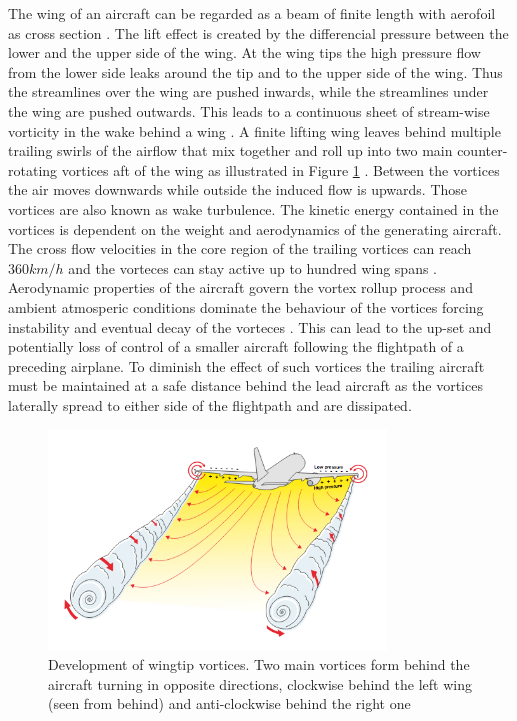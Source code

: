 The wing of an aircraft can be regarded as a beam of finite length with aerofoil as cross section \cite{hansen2015aerodynamics}. The lift effect is created by the differencial pressure between the lower and the upper side of the wing. At the wing tips the high pressure flow from the lower side leaks around the tip and to the upper side of the wing. Thus the streamlines over the wing are pushed inwards, while the streamlines under the wing are pushed outwards. This leads to a continuous sheet of stream-wise vorticity in the wake behind a wing \cite{hansen2015aerodynamics}. A finite lifting wing leaves behind multiple trailing swirls of the airflow that mix together and roll up into two main counter-rotating vortices aft of the wing as illustrated in Figure \ref{fig:vortex_develop} \cite{magazine_aibus_safety, Breitsamter2011Feb} . Between the vortices the air moves downwards while outside the induced flow is upwards. Those vortices are also known as wake turbulence. 
The kinetic energy contained in the vortices is dependent on the weight and aerodynamics of the  generating aircraft. The cross flow velocities in the core region of the trailing vortices can reach $360km/h$ and the vorteces can stay active up to hundred wing spans \cite{Breitsamter2011Feb}. Aerodynamic properties of the aircraft govern the vortex rollup process and ambient atmosperic conditions dominate the behaviour of the vortices forcing instability and eventual decay of the vorteces \cite{Hallock2018Apr}.
This can lead to the up-set and potentially loss of control of a smaller aircraft following the flightpath of a preceding airplane. To diminish the effect of such vortices the trailing aircraft must be maintained at a safe distance behind the lead aircraft as the vortices  laterally spread to either side of the flightpath and are dissipated.


\begin{figure}
  \centering
\includegraphics[width=0.8\textwidth]{graphics/WakeVortexPlane.png}
  \caption[RU Logo]{Development of wingtip vortices. Two main vortices form behind the aircraft turning in opposite directions, clockwise behind the left wing (seen from behind) and anti-clockwise behind the right one\cite{magazine_aibus_safety}} \label{fig:vortex_develop}
\end{figure}


